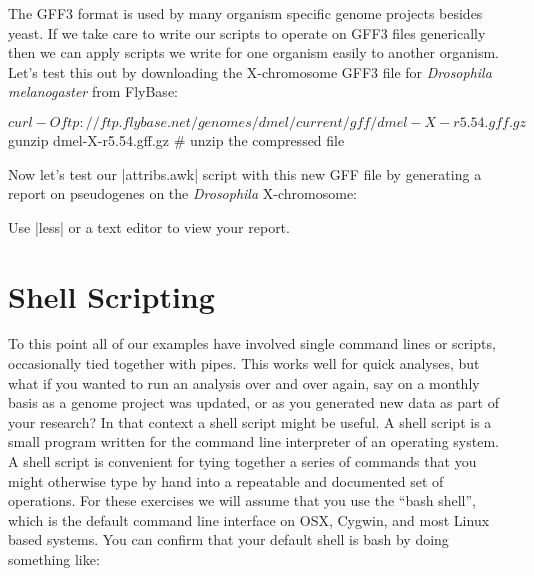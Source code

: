 The GFF3 format is used by many organism specific genome projects besides yeast. If we take care to write our scripts to operate on GFF3 files generically then we can apply scripts we write for one organism easily to another organism. Let's test this out by downloading the X-chromosome GFF3 file for \textit{Drosophila melanogaster} from FlyBase:
%
\begin{bash}
$ curl -O ftp://ftp.flybase.net/genomes/dmel/current/gff/dmel-X-r5.54.gff.gz   
$ gunzip dmel-X-r5.54.gff.gz  # unzip the compressed file
\end{bash}
%
Now let's test our |attribs.awk| script with this new GFF file by generating a report on pseudogenes on the \textit{Drosophila} X-chromosome:
%
%
Use |less| or a text editor to view your report.


\section{Shell Scripting}

To this point all of our examples have involved single command lines or scripts, occasionally tied together with pipes. This works well for quick analyses, but what if you wanted to run an analysis over and over again, say on a monthly basis as a genome project was updated, or as you generated new data as part of your research?  In that context a shell script might be useful. A shell script is a small program written for the command line interpreter of an operating system.  A shell script is convenient for tying together a series of commands that you might otherwise type by hand into a repeatable and documented set of operations. For these exercises we will assume that you use the ``bash shell'', which is the default command line interface on OSX, Cygwin, and most Linux based systems. You can confirm that your default shell is bash by doing something like:
%


